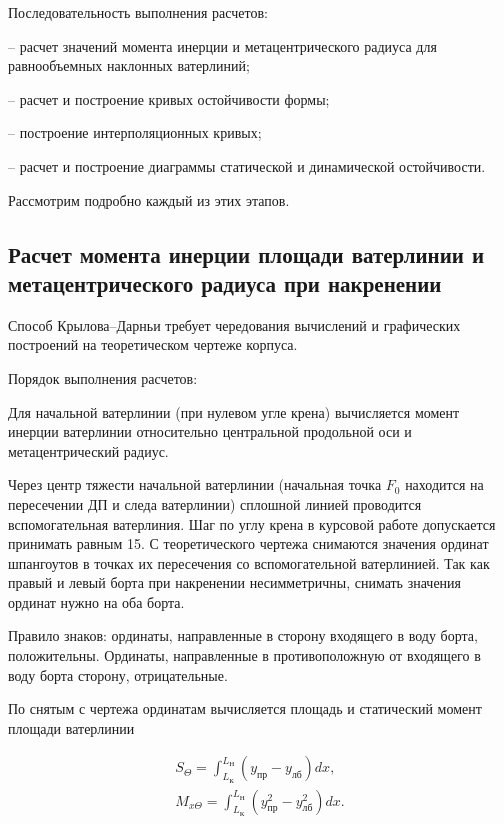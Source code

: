 Последовательность выполнения расчетов:

-- расчет значений момента инерции и метацентрического радиуса для равнообъемных наклонных ватерлиний;

-- расчет и построение кривых остойчивости формы;

-- построение интерполяционных кривых;

-- расчет и построение диаграммы статической и динамической остойчивости.

Рассмотрим подробно каждый из этих этапов.

\subsection{Расчет момента инерции площади ватерлинии и метацентрического радиуса при накренении}

Способ Крылова–Дарньи требует чередования вычислений и графических построений на теоретическом чертеже корпуса.

Порядок выполнения расчетов:

Для начальной ватерлинии (при нулевом угле крена) вычисляется момент инерции ватерлинии относительно центральной продольной оси и метацентрический радиус.

Через центр тяжести начальной ватерлинии (начальная точка $F_0$ находится на пересечении ДП и следа ватерлинии) сплошной линией проводится вспомогательная ватерлиния.
Шаг по углу крена в курсовой работе допускается принимать равным 15\textdegree.
С теоретического чертежа снимаются значения ординат шпангоутов в точках их пересечения со вспомогательной ватерлинией.
Так как правый и левый борта при накренении несимметричны, снимать значения ординат нужно на оба борта.

Правило знаков: ординаты, направленные в сторону входящего в воду борта, положительны.
Ординаты, направленные в противоположную от входящего в воду борта сторону, отрицательные.

По снятым с чертежа ординатам вычисляется площадь и статический момент площади ватерлинии

\begin{equation}
    \begin{split}
    S_{\Theta} = \int_{L_{\text{К}}}^{L_{\text{Н}}} (y_{\text{пр}} - y_{\text{лб}}) dx, \\
    M_{x\Theta} = \int_{L_{\text{К}}}^{L_{\text{Н}}} (y_{\text{пр}}^2 - y_{\text{лб}}^2) dx.
    \end{split}
\end{equation}

